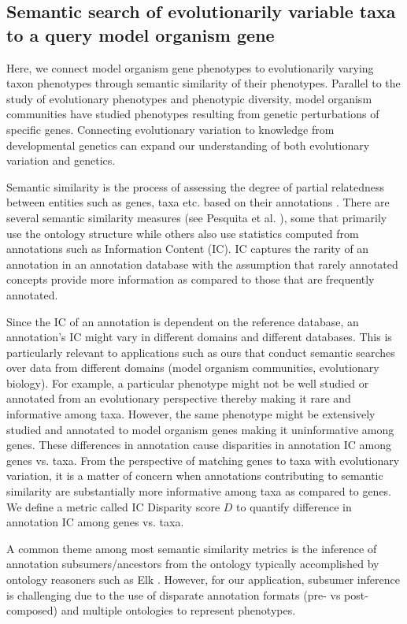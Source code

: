 \documentclass{article}
\begin{document}
\subsection{Semantic search of evolutionarily variable taxa to a query model organism gene}

Here, we connect model organism gene phenotypes to evolutionarily varying taxon phenotypes through semantic similarity of their phenotypes. Parallel to the study of evolutionary phenotypes and phenotypic diversity, model organism communities have studied phenotypes resulting from genetic perturbations of specific genes. Connecting evolutionary variation to knowledge from developmental genetics can expand our understanding of both evolutionary variation and genetics. 

Semantic similarity is the process of assessing the degree of partial relatedness between entities such as genes, taxa etc. based on their annotations \cite{pesquita2009semantic}. There are several semantic similarity measures (see Pesquita et al. \cite{pesquita2009semantic}), some that primarily use the ontology structure while others also use statistics computed from annotations such as Information Content (IC). IC captures the rarity of an annotation in an annotation database with the assumption that rarely annotated concepts provide more information as compared to those that are frequently annotated. 


Since the IC of an annotation is dependent on the reference database, an annotation's IC might vary in different domains and different databases. This is particularly relevant to applications such as ours that conduct semantic searches over data from different domains (model organism communities, evolutionary biology). For example, a particular phenotype might not be well studied or annotated from an evolutionary perspective thereby making it rare and informative among taxa. However, the same phenotype might be extensively studied and annotated to model organism genes making it uninformative among genes. These differences in annotation cause disparities in annotation IC among genes vs. taxa. From the perspective of matching genes to taxa with evolutionary variation, it is a matter of concern when annotations contributing to semantic similarity are substantially more informative among taxa as compared to genes. We define a metric called IC Disparity score $D$ to quantify difference in annotation IC among genes vs. taxa. 

A common theme among most semantic similarity metrics is the inference of annotation subsumers/ancestors from the ontology typically accomplished by ontology reasoners such as Elk \cite{kazakov2014incredible}. However, for our application, subsumer inference is challenging due to the use of disparate annotation formats (pre- vs post-composed) and multiple ontologies to represent phenotypes. 
\end{document}
